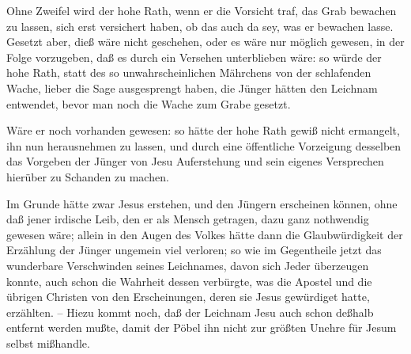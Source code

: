 \begin{aufza}
\item {}\par
Ohne Zweifel wird der hohe Rath, wenn er die Vorsicht traf, das Grab bewachen zu lassen, sich erst versichert haben, ob das auch da sey, was er bewachen lasse. Gesetzt aber, dieß wäre nicht geschehen, oder es wäre nur möglich gewesen, in der Folge vorzugeben, daß es durch ein Versehen unterblieben wäre: so würde der hohe Rath, statt des so unwahrscheinlichen Mährchens von der schlafenden Wache, lieber die Sage ausgesprengt haben, die Jünger hätten den Leichnam entwendet, bevor man noch die Wache zum Grabe gesetzt.
\item {} \par
Wäre er noch vorhanden gewesen: so hätte der hohe Rath gewiß nicht ermangelt, ihn nun herausnehmen zu lassen, und durch eine öffentliche Vorzeigung desselben das Vorgeben der Jünger von Jesu Auferstehung und sein eigenes Versprechen hierüber zu Schanden zu machen.

\begin{RWanm}
Im Grunde hätte zwar Jesus erstehen, und den Jüngern erscheinen können, ohne daß jener irdische Leib, den er als Mensch getragen, dazu ganz nothwendig gewesen wäre; allein in den Augen des Volkes hätte dann die Glaubwürdigkeit der Erzählung der Jünger ungemein viel verloren; so wie im Gegentheile jetzt das wunderbare Verschwinden seines Leichnames, davon sich Jeder überzeugen konnte, auch schon die Wahrheit dessen verbürgte, was die Apostel und die übrigen Christen von den Erscheinungen, deren sie Jesus gewürdiget hatte, erzählten. -- Hiezu kommt noch, daß der Leichnam Jesu auch schon deßhalb entfernt werden mußte, damit der Pöbel ihn nicht zur größten Unehre für Jesum selbst mißhandle.
\end{RWanm}


\end{aufza}
